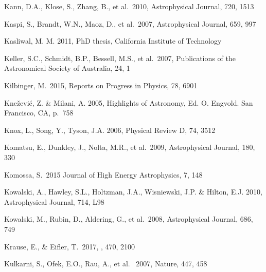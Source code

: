 \documentclass[twocolumn]{aastex61}
\begin{document}
\begin{thebibliography}{}

 Kann, D.A., Klose, S., Zhang, B., et al.~2010, Astrophysical Journal, 720, 1513


 Kaspi, S., Brandt, W.N., Maoz, D., et al.~2007, Astrophysical Journal, 659, 997

 Kasliwal, M. M. 2011, PhD thesis, California Institute of Technology

 Keller, S.C., Schmidt, B.P., Bessell, M.S., et al.~2007, Publications of the Astronomical Society of Australia, 24, 1

 Kilbinger, M.~2015, Reports on Progress in Physics, 78, 6901

 Kne\v{z}evi\'{c}, Z. \& Milani, A. 2005, Highlights of Astronomy, Ed. O. Engvold. San Francisco, CA, p.~758

 Knox, L., Song, Y., Tyson, J.A. 2006, Physical Review D, 74, 3512

 Komatsu, E., Dunkley, J., Nolta, M.R., et al.~2009, Astrophysical Journal, 180, 330

 Komossa, S.~2015 Journal of High Energy Astrophysics, 7, 148


 Kowalski, A., Hawley, S.L., Holtzman, J.A., Wisniewski, J.P. \& Hilton, E.J. 2010, Astrophysical Journal, 714, L98

 Kowalski, M., Rubin, D., Aldering, G., et al.~2008,  Astrophysical Journal, 686, 749

 Krause, E., \& Eifler, T.\ 2017, \mnras, 470, 2100

 Kulkarni, S., Ofek, E.O., Rau, A., et al.~ 2007, Nature, 447, 458


\end{thebibliography}
\end{document}
